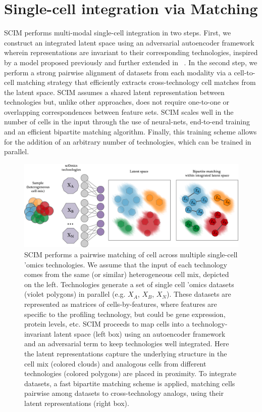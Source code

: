
\section{Single-cell integration via Matching}
SCIM performs multi-modal single-cell integration in two steps.
First, we construct an integrated latent space using an adversarial autoencoder framework \cite{makhzani2015} wherein representations are invariant to their corresponding technologies,
inspired by a model proposed previously \cite{yang2019a} and further extended in ~\cite{yang2019b}.
In the second step, we perform a strong pairwise alignment of datasets from each modality via a cell-to-cell matching strategy that efficiently extracts cross-technology cell matches from the latent space.
SCIM assumes a shared latent representation between technologies but, unlike other approaches, does not require one-to-one or overlapping correspondences between feature sets.
SCIM scales well in the number of cells in the input through the use of neural-nets, end-to-end training and an efficient bipartite matching algorithm.
Finally, this training scheme allows for the addition of an arbitrary number of technologies, which can be trained in parallel.

\begin{figure}[ht]
    \centering
    \includegraphics[width=\textwidth]{figures/integration/pipeline.png}
    \caption{
    SCIM performs a pairwise matching of cell across multiple single-cell 'omics technologies. We assume that the input of each technology comes from the same (or similar) heterogeneous cell mix, depicted on the left. Technologies generate a set of single cell 'omics datasets (violet polygons) in parallel (e.g. $X_A$, $X_B$, $X_N$).
    These datasets are represented as matrices of cells-by-features, where features are specific to the profiling technology, but could be gene expression, protein levels, etc.
    SCIM proceeds to map cells into a technology-invariant latent space (left box) using an autoencoder framework and an adversarial term to keep technologies well integrated.
    Here the latent representations capture the underlying structure in the cell mix (colored clouds) and analogous cells from different technologies (colored polygons) are placed in proximity.
    To integrate datasets, a fast bipartite matching scheme is applied, matching cells pairwise among datasets to cross-technology analogs, using their latent representations (right box).
    }
\end{figure}

